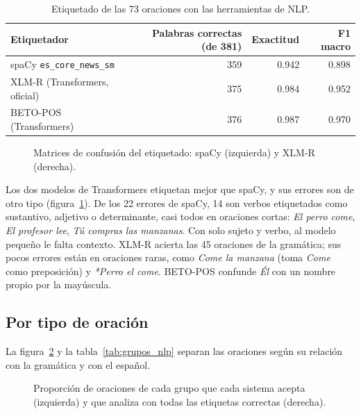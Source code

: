 \begin{table}[h]
  \centering
  \small
  \begin{tabular}{lrrr}
    \toprule
    Etiquetador & Palabras correctas (de 381) & Exactitud & F1 macro \\
    \midrule
    spaCy \texttt{es\_core\_news\_sm} & 359 & 0.942 & 0.898 \\
    XLM-R (Transformers, oficial) & 375 & 0.984 & 0.952 \\
    BETO-POS (Transformers) & 376 & 0.987 & 0.970 \\
    \bottomrule
  \end{tabular}
  \caption{Etiquetado de las 73 oraciones con las herramientas de NLP.}
  \label{tab:etiquetadores}
\end{table}

\begin{figure}[h]
  \centering
  \hfill
  \caption{Matrices de confusión del etiquetado: spaCy (izquierda) y XLM-R (derecha).}
  \label{fig:matrices_nlp}
\end{figure}

Los dos modelos de Transformers etiquetan mejor que spaCy, y sus errores son de otro tipo
(figura~\ref{fig:matrices_nlp}). De los 22 errores de spaCy, 14 son verbos etiquetados como
sustantivo, adjetivo o determinante, casi todos en oraciones cortas: \emph{El perro come},
\emph{El profesor lee}, \emph{Tú compras las manzanas}. Con solo sujeto y verbo, al modelo
pequeño le falta contexto. XLM-R acierta las 45 oraciones de la gramática; sus pocos errores
están en oraciones raras, como \emph{Come la manzana} (toma \emph{Come} como preposición) y
\emph{*Perro el come}. BETO-POS confunde \emph{Él} con un nombre propio por la mayúscula.

\subsection{Por tipo de oración}

La figura~\ref{fig:comparacion_cfg_grupos} y la tabla~\ref{tab:grupos_nlp} separan las
oraciones según su relación con la gramática y con el español.

\begin{figure}[h]
  \centering
  \caption{Proporción de oraciones de cada grupo que cada sistema acepta (izquierda) y que
    analiza con todas las etiquetas correctas (derecha).}
  \label{fig:comparacion_cfg_grupos}
\end{figure}

